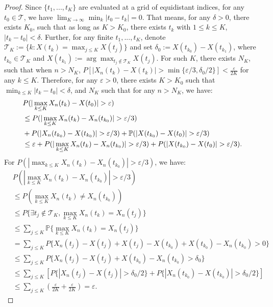 \documentclass[
  12pt]{article}
\def\to{\rightarrow}
\def\mP{\mathbb{P}}
\def\cT{\mathcal{T}}
\begin{document}
\begin{proof}
      Since $\{t_1,...,t_K\}$ are evaluated at a grid of equidistant indices, for any $t_0 \in \cT$, we have $\lim_{K \to \infty} \min_{k} |t_0 - t_k| = 0$. That means, for any $\delta > 0$, there exists $K_0$, such that as long as $K > K_0$, there exists $t_k$ with $1 \leq k \leq K$, $|t_k - t_0| < \delta$. Further, for any finite $t_1,...,t_K$, denote $\cT_K:=\{k: X(t_k) = \max_{j \leq K} X(t_j)\}$ and set $\delta_0:= X(t_{k_0}) - X(t_{k_1})$, where $t_{k_0} \in \cT_K$ and $X(t_{k_1}):=\arg\max_{t_j \not\in \cT_K} X(t_j)$. For such $K$, there exists $N_K$, such that when $n > N_K$, $P\left[|X_n(t_k) - X(t_k)|>\min\{\varepsilon/3, \delta_0/2\}\right] < \frac{\varepsilon}{2K}$ for any $k \leq K$. Therefore, for any $\varepsilon > 0$, there exists $K > K_0$ such that $\min_{k \leq K} |t_k - t_0| < \delta$, and $N_K$ such that for any $n > N_K$, we have:
      \begin{align*}
      \allowdisplaybreaks
          & P(|\max_{k \leq K}X_n(t_k) - X(t_0)| > \varepsilon) \\
          & \leq P(|\max_{k \leq K} X_n(t_k) - X_n(t_{k_0})| > \varepsilon/3) \\
          & + P(|X_n(t_{k_0}) - X(t_{k_0})| > \varepsilon/3) + \mP(|X(t_{k_0}) - X(t_{0})| > \varepsilon/3) \\
          & \leq \varepsilon + P(|\max_{k \leq K} X_n(t_k) - X_n(t_{k_0})| > \varepsilon/3) + P(|X(t_{k_0}) - X(t_{0})| > \varepsilon/3).
      \end{align*}
For $P(|\max_{k \leq K} X_n(t_k) - X_n(t_{k_0})| > \varepsilon/3)$, we have:
\begingroup
\allowdisplaybreaks
\begin{align*}
    & P(|\max_{k \leq K} X_n(t_k) - X_n(t_{k_0})| > \varepsilon/3) \\
    & \leq P(\max_{k \leq K} X_n(t_k) \neq X_n(t_{k_0})) \\
    & \leq P\{\exists t_j \not\in \cT_K, \max_{k \leq K} X_n(t_k) = X_n(t_j)\} \\
    & \leq \sum_{j \leq K} \mP\{\max_{k \leq K} X_n(t_k) = X_n(t_j)\} \\
    & = \sum_{j \leq K} P\{X_n(t_j) - X(t_j) + X(t_j) - X(t_{k_0}) + X(t_{k_0}) - X_n(t_{k_0}) > 0\} \\
    & \leq \sum_{j \leq K} P\{X_n(t_j) - X(t_j) + X(t_{k_0}) - X_n(t_{k_0}) > \delta_0 \} \\
    & \leq \sum_{j \leq K} \left[ P\{|X_n(t_j) - X(t_j)| > \delta_0/2\} +  P\{|X_n(t_{k_0}) - X(t_{k_0})| > \delta_0/2\} \right] \\
    & \leq \sum_{j \leq K} \left( \frac{\varepsilon}{2K} + \frac{\varepsilon}{2K}\right) = \varepsilon. 

\end{align*}
\end{proof}
\end{document}
